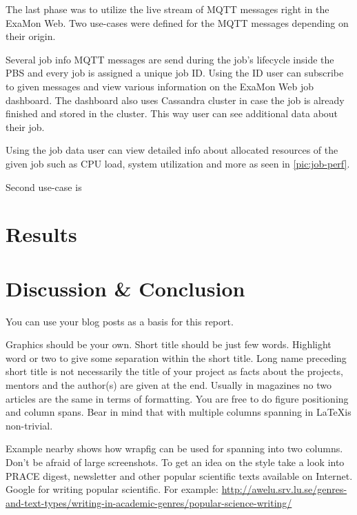 \documentclass[a4paper, twoside]{article}
\newcommand{\highlight}[1]{\textcolor{prace-orange}{#1}}
\begin{document}
\begin{multicols}{3}
The last phase was to utilize the live stream of MQTT messages right in the ExaMon Web. Two use-cases were defined for the MQTT messages depending on their origin.

Several job info MQTT messages are send during the job's lifecycle inside the PBS and every job is assigned a unique job ID. Using the ID user can subscribe to given messages and view various information on the ExaMon Web job dashboard. The dashboard also uses Cassandra cluster in case the job is already finished and stored in the cluster. This way user can see additional data about their job.

Using the job data user can view detailed info about allocated resources of the given job such as CPU load, system utilization and more as seen in \ref{pic:job-perf}.

Second use-case is


\section{Results}
\section{Discussion \& Conclusion}

You can use your blog posts as a basis for this report.

Graphics should be your own. Short title should be just few words. Highlight word or two to give some separation within the short title. Long name preceding short title is not necessarily the title of your project as facts about the projects, mentors and the author(s) are given at the end. Usually in magazines no two articles are the same in terms of formatting. You are free to do figure positioning and column spans. Bear in mind that with multiple columns spanning in \LaTeX is non-trivial.

Example nearby shows how wrapfig can be used for spanning into two columns. Don't be afraid of large screenshots. To get an idea on the style take a look into PRACE digest, newsletter and other popular scientific texts available on Internet. Google for \highlight{writing popular scientific}. For example: \url{http://awelu.srv.lu.se/genres-and-text-types/writing-in-academic-genres/popular-science-writing/}


\end{multicols}
\end{document}
